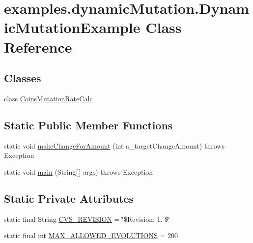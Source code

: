 \hypertarget{classexamples_1_1dynamic_mutation_1_1_dynamic_mutation_example}{\section{examples.\-dynamic\-Mutation.\-Dynamic\-Mutation\-Example Class Reference}
\label{classexamples_1_1dynamic_mutation_1_1_dynamic_mutation_example}
}
\subsection*{Classes}
\begin{DoxyCompactItemize}
\item 
class \hyperlink{classexamples_1_1dynamic_mutation_1_1_dynamic_mutation_example_1_1_coins_mutation_rate_calc}{Coins\-Mutation\-Rate\-Calc}
\end{DoxyCompactItemize}
\subsection*{Static Public Member Functions}
\begin{DoxyCompactItemize}
\item 
static void \hyperlink{classexamples_1_1dynamic_mutation_1_1_dynamic_mutation_example_a64274d3c520db61da864a30a0cb28d69}{make\-Change\-For\-Amount} (int a\-\_\-target\-Change\-Amount)  throws Exception 
\item 
static void \hyperlink{classexamples_1_1dynamic_mutation_1_1_dynamic_mutation_example_a8249210ab90f72e70b46c6588ac9f96e}{main} (String\mbox{[}$\,$\mbox{]} args)  throws Exception 
\end{DoxyCompactItemize}
\subsection*{Static Private Attributes}
\begin{DoxyCompactItemize}
\item 
static final String \hyperlink{classexamples_1_1dynamic_mutation_1_1_dynamic_mutation_example_a40796ee64883e52b1a35c819fd8a867c}{C\-V\-S\-\_\-\-R\-E\-V\-I\-S\-I\-O\-N} = \char`\"{}\$Revision\-: 1. \$\char`\"{}
\item 
static final int \hyperlink{classexamples_1_1dynamic_mutation_1_1_dynamic_mutation_example_a74bd73189529620c12a7b9c228aa04fc}{M\-A\-X\-\_\-\-A\-L\-L\-O\-W\-E\-D\-\_\-\-E\-V\-O\-L\-U\-T\-I\-O\-N\-S} = 200
\end{DoxyCompactItemize}


